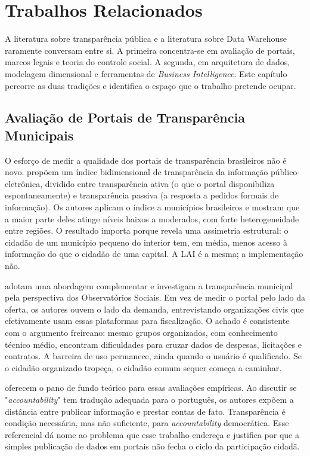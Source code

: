 \chapter{Trabalhos Relacionados}
\label{cap:trabalhos}

A literatura sobre transparência pública e a literatura sobre Data Warehouse raramente conversam entre si. A primeira concentra-se em avaliação de portais, marcos legais e teoria do controle social. A segunda, em arquitetura de dados, modelagem dimensional e ferramentas de \textit{Business Intelligence}. Este capítulo percorre as duas tradições e identifica o espaço que o trabalho pretende ocupar.

\section{Avaliação de Portais de Transparência Municipais}

O esforço de medir a qualidade dos portais de transparência brasileiros não é novo.  propõem um índice bidimensional de transparência da informação público-eletrônica, dividido entre transparência ativa (o que o portal disponibiliza espontaneamente) e transparência passiva (a resposta a pedidos formais de informação). Os autores aplicam o índice a municípios brasileiros e mostram que a maior parte deles atinge níveis baixos a moderados, com forte heterogeneidade entre regiões. O resultado importa porque revela uma assimetria estrutural: o cidadão de um município pequeno do interior tem, em média, menos acesso à informação do que o cidadão de uma capital. A LAI é a mesma; a implementação não.

 adotam uma abordagem complementar e investigam a transparência municipal pela perspectiva dos Observatórios Sociais. Em vez de medir o portal pelo lado da oferta, os autores ouvem o lado da demanda, entrevistando organizações civis que efetivamente usam essas plataformas para fiscalização. O achado é consistente com o argumento freireano: mesmo grupos organizados, com conhecimento técnico médio, encontram dificuldades para cruzar dados de despesas, licitações e contratos. A barreira de uso permanece, ainda quando o usuário é qualificado. Se o cidadão organizado tropeça, o cidadão comum sequer começa a caminhar.

 oferecem o pano de fundo teórico para essas avaliações empíricas. Ao discutir se "\textit{accountability}" tem tradução adequada para o português, os autores expõem a distância entre publicar informação e prestar contas de fato. Transparência é condição necessária, mas não suficiente, para \textit{accountability} democrática. Esse referencial dá nome ao problema que esse trabalho endereça e justifica por que a simples publicação de dados em portais não fecha o ciclo da participação cidadã.

